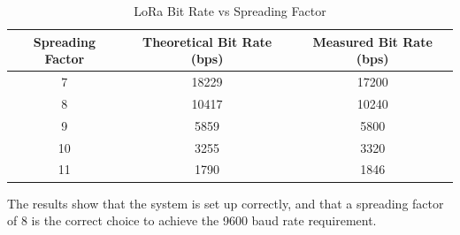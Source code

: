 \begin{table}[!htb]
  \centering
  \renewcommand{\arraystretch}{1.2}
  \begin{tabular}{ |c|c|c| }
  \hline
  \textbf{Spreading Factor}        & \textbf{Theoretical Bit Rate (bps)}      & \textbf{Measured Bit Rate (bps)}    \\
  \hline
  7         & 18229         & 17200       \\  \hline
  8         & 10417         & 10240       \\  \hline
  9         & 5859          & 5800        \\  \hline
  10        & 3255          & 3320        \\  \hline
  11        & 1790          & 1846        \\  \hline
  \end{tabular}
  \caption{LoRa Bit Rate vs Spreading Factor}
  \label{tab:loraBitRate}
\end{table}

The results show that the system is set up correctly, and that a spreading factor of 8 is the correct choice to achieve the 9600 baud rate requirement.